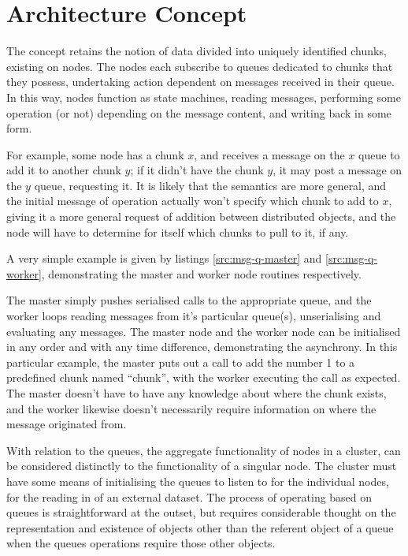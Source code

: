 \documentclass[a4paper,10pt]{article}
\begin{document}
\section{Architecture Concept}
The concept retains the notion of data divided into uniquely identified chunks,
existing on nodes.
The nodes each subscribe to queues dedicated to chunks that they possess,
undertaking action dependent on messages received in their queue.
In this way, nodes function as state machines, reading messages, performing
some operation (or not) depending on the message content, and writing back in
some form.

For example, some node has a chunk \(x\), and receives a message on the \(x\)
queue to add it to another chunk \(y\); if it didn't have the chunk \(y\), it
may post a message on the \(y\) queue, requesting it.
It is likely that the semantics are more general, and the initial message of
operation actually won't specify which chunk to add to \(x\), giving it a more
general request of addition between distributed objects, and the node will have
to determine for itself which chunks to pull to it, if any.

A very simple example is given by listings \ref{src:msg-q-master} and
\ref{src:msg-q-worker}, demonstrating the master and worker node routines
respectively.





The master simply pushes serialised calls to the appropriate queue, and the
worker loops reading messages from it's particular queue(s), unserialising and
evaluating any messages.
The master node and the worker node can be initialised in any order and with
any time difference, demonstrating the asynchrony.
In this particular example, the master puts out a call to add the number 1 to a
predefined chunk named ``chunk'', with the worker executing the call as
expected.
The master doesn't have to have any knowledge about where the chunk exists, and
the worker likewise doesn't necessarily require information on where the
message originated from.

With relation to the queues, the aggregate functionality of nodes in a cluster,
can be considered distinctly to the functionality of a singular node.  
The cluster must have some means of initialising the queues to listen to for
the individual nodes, for the reading in of an external dataset.
The process of operating based on queues is straightforward at the outset, but
requires considerable thought on the representation and existence of objects
other than the referent object of a queue when the queues operations require
those other objects.
\end{document}
